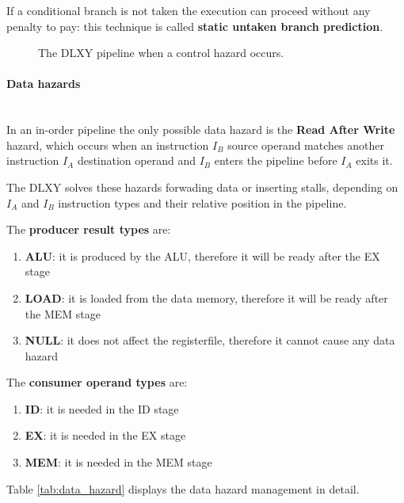 \bigskip
If a conditional branch is not taken the execution can proceed without any
penalty to pay: this technique is called \textbf{static untaken branch prediction}.

\begin{figure}[H]
	\centering
	\caption{The DLXY pipeline when a control hazard occurs.}
	\label{fig:ctrl_hazard}
\end{figure}

\paragraph{Data hazards} \mbox{} \\
In an in-order pipeline the only possible data hazard is the \textbf{Read After
Write} hazard, which occurs when an instruction $I_B$ source operand matches
another instruction $I_A$ destination operand and $I_B$ enters the pipeline
before $I_A$ exits it.

\bigskip
The DLXY solves these hazards forwading data or inserting stalls, depending on
$I_A$ and $I_B$ instruction types and their relative position in the pipeline.

\bigskip
The \textbf{producer result types} are:
\begin{enumerate}
	\item \textbf{ALU}: it is produced by the ALU, therefore it will be
		ready after the EX stage
	\item \textbf{LOAD}: it is loaded from the data memory, therefore it
		will be ready after the MEM stage
	\item \textbf{NULL}: it does not affect the registerfile, therefore it
		cannot cause any data hazard
\end{enumerate}

\bigskip
The \textbf{consumer operand types} are:
\begin{enumerate}
	\item \textbf{ID}: it is needed in the ID stage
	\item \textbf{EX}: it is needed in the EX stage
	\item \textbf{MEM}: it is needed in the MEM stage
\end{enumerate}

\bigskip
Table \ref{tab:data_hazard} displays the data hazard management in detail.

